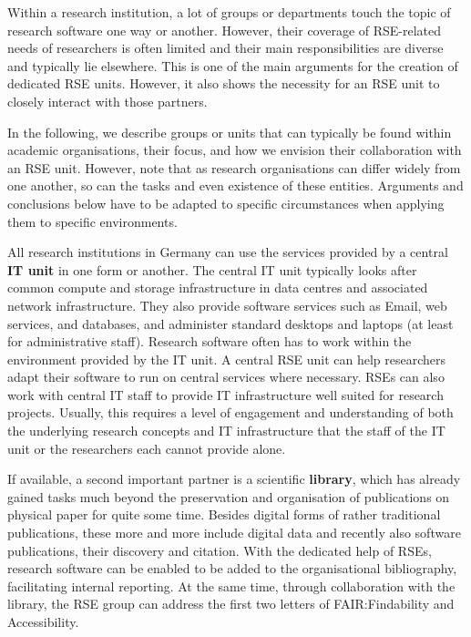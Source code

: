 \documentclass[10pt,letterpaper]{article}
\begin{document}
Within a research institution, a lot of groups or departments touch the topic of research software one way or another.
However, their coverage of RSE-related needs of researchers is often limited and their main responsibilities are diverse and typically lie elsewhere.
This is one of the main arguments for the creation of dedicated RSE units.
However, it also shows the necessity for an RSE unit to closely interact with those partners.

In the following, we describe groups or units that can typically be found within academic organisations, their focus, and how we envision their collaboration with an RSE unit.
However, note that as research organisations can differ widely from one another, so can the tasks and even existence of these entities.
Arguments and conclusions below have to be adapted to specific circumstances when applying them to specific environments.

All research institutions in Germany can use the services provided by a central \textbf{IT unit} in one form or another.
The central IT unit typically looks after common compute and storage infrastructure in data centres and associated network infrastructure.
They also provide software services such as Email, web services, and databases, and administer standard desktops and laptops (at least for administrative staff).
Research software often has to work within the environment provided by the IT unit.
A central RSE unit can help researchers adapt their software to run on central services where necessary.
RSEs can also work with central IT staff to provide IT infrastructure well suited for research projects.
Usually, this requires a level of engagement and understanding of both the underlying research concepts and IT infrastructure that the staff of the IT unit or the researchers each cannot provide alone.

If available, a second important partner is a scientific \textbf{library}, which has already gained tasks much beyond the preservation and organisation of publications on physical paper for quite some time.
Besides digital forms of rather traditional publications, these more and more include digital data and recently also software publications, their discovery and citation.
With the dedicated help of RSEs, research software can be enabled to be added to the organisational bibliography, facilitating internal reporting.
At the same time, through collaboration with the library, the RSE group can address the first two letters of FAIR:\@ Findability and Accessibility.
\end{document}
